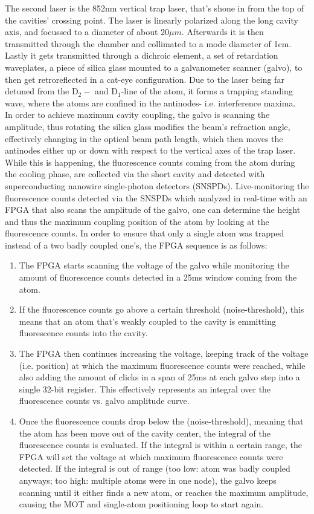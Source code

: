 The second laser is the 852nm vertical trap laser, that's shone in from the top of the cavities' crossing point. The laser is linearly polarized along the long cavity axis, and focussed to a diameter of about $20\mu m$. Afterwards it is then transmitted through the chamber and collimated to a mode diameter of 1cm. Lastly it gets transmitted through a dichroic element, a set of retardation waveplates, a piece of silica glass mounted to a galvanometer scanner (galvo), to then get retroreflected in a cat-eye configuration. Due to the laser being far detuned from the $\text{D}_2-$ and $\text{D}_1\text{-line}$ of the atom, it forms a trapping standing wave, where the atoms are confined in the antinodes- i.e. interference maxima.\\

In order to achieve maximum cavity coupling, the galvo is scanning the amplitude, thus rotating the silica glass modifies the beam's refraction angle, effectively changing in the optical beam path length, which then moves the antinodes either up or down with respect to the vertical axes of the trap laser. While this is happening, the fluorescence counts coming from the atom during the cooling phase, are collected via the short cavity and detected with superconducting nanowire single-photon detectors (SNSPDs). Live-monitoring the fluorescence counts detected via the SNSPDs which analyzed in real-time with an FPGA that also scans the amplitude of the galvo, one can determine the height and thus the maximum coupling position of the atom by looking at the fluorescence counts. In order to ensure that only a single atom was trapped instead of a two badly coupled one's, the FPGA sequence is as follows:
\begin{enumerate}
	\item The FPGA starts scanning the voltage of the galvo while monitoring the amount of fluorescence counts detected in a 25ms window coming from the atom.
	\item If the fluorescence counts go above a certain threshold (noise-threshold), this means that an atom that's weakly coupled to the cavity is emmitting fluorescence counts into the cavity.
	\item The FPGA then continues increasing the voltage, keeping track of the voltage (i.e. position) at which the maximum fluorescence counts were reached, while also adding the amount of clicks in a span of 25ms at each galvo step into a single 32-bit register. This effectively represents an integral over the fluorescence counts vs. galvo amplitude curve.
	\item Once the fluorescence counts drop below the (noise-threshold), meaning that the atom has been move out of the cavity center, the integral of the fluorescence counts is evaluated. If the integral is within a certain range, the FPGA will set the voltage at which maximum fluorescence counts were detected. If the integral is out of range (too low: atom was badly coupled anyways; too high: multiple atoms were in one node), the galvo keeps scanning until it either finds a new atom, or reaches the maximum amplitude, causing the MOT and single-atom positioning loop to start again.
\end{enumerate}

